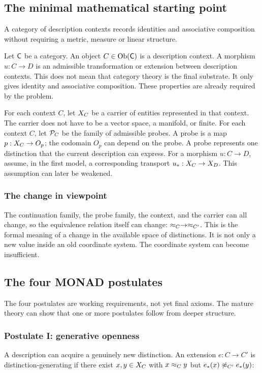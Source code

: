 \subsection{The minimal mathematical starting point}

A category of description contexts records identities and associative
composition without requiring a metric, measure or linear structure.

Let $\mathsf{C}$ be a category. An object $C \in \operatorname{Ob}(\mathsf{C})$ is
a description context. A morphism $u : C \to D$ is an admissible
transformation or extension between description contexts. This does
not mean that category theory is the final substrate. It only gives
identity and associative composition. These properties are already
required by the problem.

For each context $C$, let $X_{C}$ be a carrier of entities
represented in that context. The carrier does not have to be a vector
space, a manifold, or finite. For each context $C$, let $\mathcal{P}_{C}$
be the family of admissible probes. A probe is a map
$p : X_{C} \to O_p$; the codomain $O_p$ can depend on the probe.
A probe represents one distinction that the current description can
express. For a morphism $u : C \to D$, assume, in the first model, a
corresponding transport $u_* : X_{C} \to X_{D}$. This
assumption can later be weakened.



\subsubsection{The change in viewpoint}

The continuation family, the probe family, the context, and the
carrier can all change, so the equivalence relation itself can change:
$\approx_{C} \to \approx_{C'}$. This is the formal meaning of a change
in the available space of distinctions. It is not only a new value
inside an old coordinate system. The coordinate system can become
insufficient.

\subsection{The four MONAD postulates}

The four postulates are working requirements, not yet final axioms.
The mature theory can show that one or more postulates follow from
deeper structure.

\subsubsection{Postulate I: generative openness}\label{ss:non-factorization}
A description can acquire a genuinely new distinction. An extension
$e : C \to C'$ is distinction-generating if there exist
$x, y \in X_{C}$ with $x \approx_{C} y$ but
$e_*(x) \not\approx_{C'} e_*(y)$:

